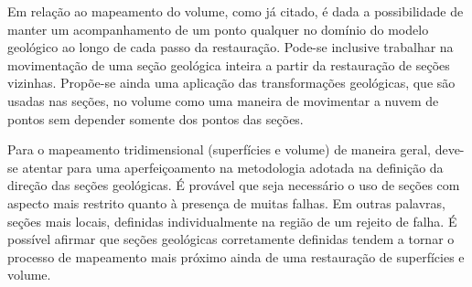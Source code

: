 Em relação ao mapeamento do volume, como já citado, é dada a possibilidade de manter um acompanhamento de um ponto qualquer no domínio do modelo geológico ao longo de cada passo da restauração. Pode-se inclusive trabalhar na movimentação de uma seção geológica inteira a partir da restauração de seções vizinhas. Propõe-se ainda uma aplicação das transformações geológicas, que são usadas nas seções, no volume como uma maneira de movimentar a nuvem de pontos sem depender somente dos pontos das seções.

Para o mapeamento tridimensional (superfícies e volume) de maneira geral, deve-se atentar para uma aperfeiçoamento na metodologia adotada na definição da direção das seções geológicas. É provável que seja necessário o uso de seções com aspecto mais restrito quanto à presença de muitas falhas. Em outras palavras, seções mais locais, definidas individualmente na região de um rejeito de falha. É possível afirmar que seções geológicas corretamente definidas tendem a tornar o processo de mapeamento mais próximo ainda de uma restauração de superfícies e volume.